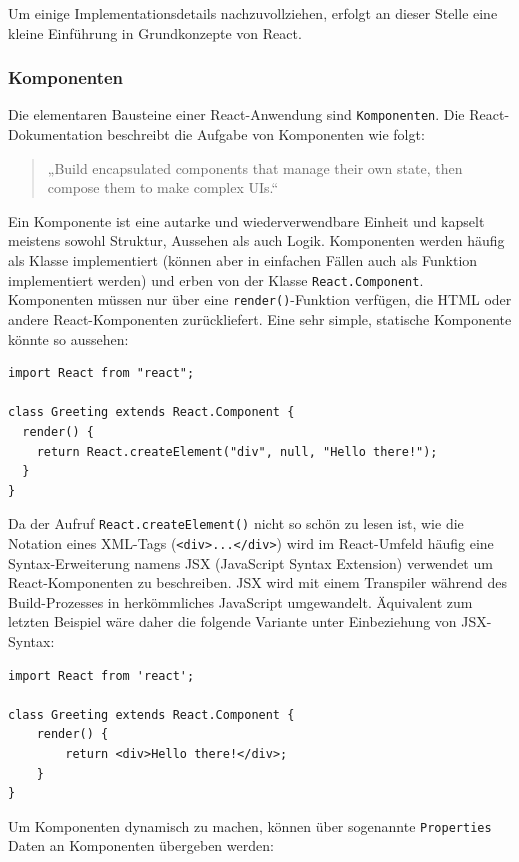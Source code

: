 Um einige Implementationsdetails nachzuvollziehen, erfolgt an dieser Stelle eine kleine Einführung in Grundkonzepte von React.

\subsubsection{Komponenten}
Die elementaren Bausteine einer React-Anwendung sind \texttt{Komponenten}. Die React-Dokumentation beschreibt die Aufgabe von Komponenten wie folgt\cite{web:react}:
\begin{quotation}
„Build encapsulated components that manage their own state, then compose them to make complex UIs.“
\end{quotation}

Ein Komponente ist eine autarke und wiederverwendbare Einheit und kapselt meistens sowohl Struktur, Aussehen als auch Logik. Komponenten werden häufig als Klasse implementiert (können aber in einfachen Fällen auch als Funktion implementiert werden) und erben von der Klasse \texttt{React.Component}. Komponenten müssen nur über eine \texttt{render()}-Funktion verfügen, die HTML oder andere React-Komponenten zurückliefert. Eine sehr simple, statische Komponente könnte so aussehen:

\begin{lstlisting}
import React from "react";

class Greeting extends React.Component {
  render() {
    return React.createElement("div", null, "Hello there!");
  }
}
\end{lstlisting}

Da der Aufruf \texttt{React.createElement()} nicht so schön zu lesen ist, wie die Notation eines XML-Tags (\texttt{<div>...</div>}) wird im React-Umfeld häufig eine Syntax-Erweiterung namens JSX (JavaScript Syntax Extension) verwendet um React-Komponenten zu beschreiben. JSX wird mit einem Transpiler während des Build-Prozesses in herkömmliches JavaScript umgewandelt. Äquivalent zum letzten Beispiel wäre daher die folgende Variante unter Einbeziehung von JSX-Syntax:

\begin{lstlisting}
import React from 'react';

class Greeting extends React.Component {
    render() {
        return <div>Hello there!</div>;
    }
}
\end{lstlisting}

Um Komponenten dynamisch zu machen, können über sogenannte \texttt{Properties} Daten an Komponenten übergeben werden:

